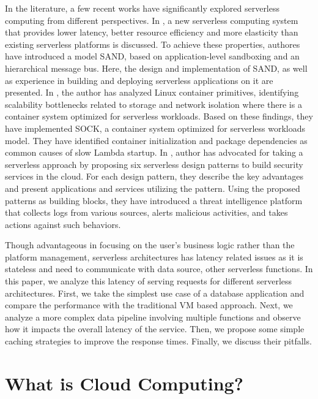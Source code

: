 In the literature, a few recent works have significantly explored serverless computing from different perspectives. In \cite{Akkus_Sand_Usenix_2018}, a new serverless computing system that provides lower latency, better resource efficiency and more elasticity than existing serverless platforms is discussed. To achieve these properties, authores have introduced a model SAND, based on application-level sandboxing and an hierarchical message bus. Here, the design and implementation of SAND, as well as experience in building and deploying serverless applications on it are presented. In \cite{Oakes_USENIX_2018}, the author has analyzed Linux container primitives, identifying scalability bottlenecks related to storage and network isolation where there is a container system optimized for serverless workloads. Based on these findings, they have implemented SOCK, a container system optimized for serverless workloads model. They have identified container initialization and package dependencies as common causes of slow Lambda startup. In \cite{Hong_USENIX_2018}, author has advocated for taking a serverless approach by proposing six serverless design patterns to build security services in the cloud. For each design pattern, they describe the key advantages and present applications and services utilizing the pattern. Using the proposed patterns as building blocks, they have introduced a threat intelligence platform that collects logs from various sources,  alerts malicious activities, and takes actions against such behaviors.


Though advantageous in focusing on the user's business logic rather than the platform management, serverless architectures has latency related issues as it is stateless and need to communicate with data source, other serverless functions. In this paper, we analyze this latency of serving requests for different serverless architectures. First, we take the simplest use case of a database application and compare the performance with the traditional VM based approach. Next, we analyze a more complex data pipeline involving multiple functions and observe how it impacts the overall latency of the service. Then, we propose some simple caching strategies to improve the response times. Finally, we discuss their pitfalls.
\section{What is Cloud Computing?}

